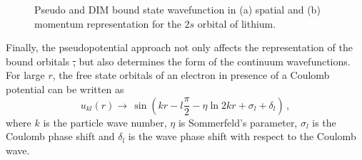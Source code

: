 \documentclass[10pt]{article}
\providecommand{\DIFaddtex}[1]{{\protect\color{blue}\uwave{#1}}} %
\providecommand{\DIFdeltex}[1]{{\protect\color{red}\sout{#1}}}                      %
\providecommand{\DIFaddbegin}{} %
\providecommand{\DIFaddend}{} %
\providecommand{\DIFdelbegin}{} %
\providecommand{\DIFdelend}{} %
\providecommand{\DIFadd}[1]{\texorpdfstring{\DIFaddtex{#1}}{#1}} %
\providecommand{\DIFdel}[1]{\texorpdfstring{\DIFdeltex{#1}}{}} %
\begin{document}
\begin{figure}[H]
 \caption{Pseudo and DIM bound state wavefunction in (a) spatial
 and (b) momentum representation for the
 $2s$ orbital of lithium.}
 \label{fig:wavesLi}
\end{figure}

Finally, the pseudopotential approach not only affects the 
representation of the bound orbitals \DIFdelbegin \DIFdel{, }\DIFdelend but also determines the form of 
the continuum wavefunctions. For large $r$, the free state orbitals of 
an electron in \DIFaddbegin \DIFadd{the }\DIFaddend presence of a Coulomb potential can be written as
\begin{equation}
 u_{kl}(r) \rightarrow \,\sin \left( kr - l\frac{\pi}{2} - \eta \ln 2kr +
 \sigma_l + \delta_l \right)\,,
\end{equation}
where $k$ is the particle wave number, $\eta$ is Sommerfeld's 
parameter, $\sigma_l$ is the Coulomb phase shift and $\delta_l$ is the 
wave phase shift with respect to the Coulomb wave.
\end{document}
